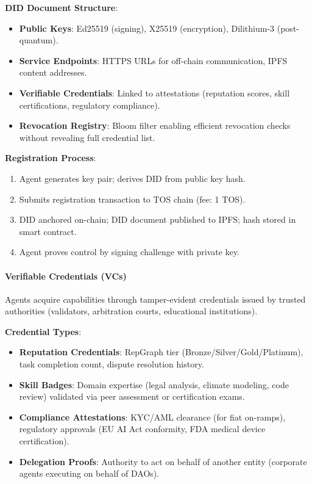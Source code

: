 \documentclass[11pt]{article}
\begin{document}
\textbf{DID Document Structure}:
\begin{itemize}[noitemsep]
  \item \textbf{Public Keys}: Ed25519 (signing), X25519 (encryption), Dilithium-3 (post-quantum).
  \item \textbf{Service Endpoints}: HTTPS URLs for off-chain communication, IPFS content addresses.
  \item \textbf{Verifiable Credentials}: Linked to attestations (reputation scores, skill certifications, regulatory compliance).
  \item \textbf{Revocation Registry}: Bloom filter enabling efficient revocation checks without revealing full credential list.
\end{itemize}

\textbf{Registration Process}:
\begin{enumerate}[noitemsep]
  \item Agent generates key pair; derives DID from public key hash.
  \item Submits registration transaction to TOS chain (fee: 1 TOS).
  \item DID anchored on-chain; DID document published to IPFS; hash stored in smart contract.
  \item Agent proves control by signing challenge with private key.
\end{enumerate}

\paragraph{Verifiable Credentials (VCs)}
Agents acquire capabilities through tamper-evident credentials issued by trusted authorities (validators, arbitration courts, educational institutions).

\textbf{Credential Types}:
\begin{itemize}[noitemsep]
  \item \textbf{Reputation Credentials}: RepGraph tier (Bronze/Silver/Gold/Platinum), task completion count, dispute resolution history.
  \item \textbf{Skill Badges}: Domain expertise (legal analysis, climate modeling, code review) validated via peer assessment or certification exams.
  \item \textbf{Compliance Attestations}: KYC/AML clearance (for fiat on-ramps), regulatory approvals (EU AI Act conformity, FDA medical device certification).
  \item \textbf{Delegation Proofs}: Authority to act on behalf of another entity (corporate agents executing on behalf of DAOs).
\end{itemize}
\end{document}
